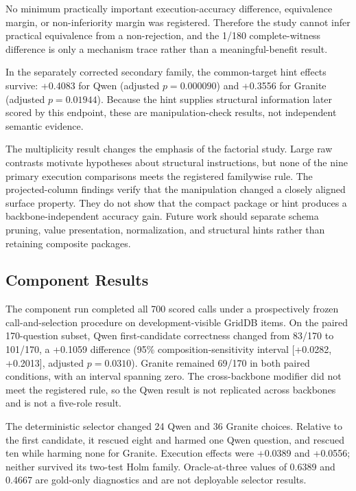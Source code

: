 \documentclass[applsci,article,submit,moreauthors]{Definitions/mdpi}
\begin{document}
No minimum practically important execution-accuracy difference, equivalence margin, or non-inferiority margin was registered. Therefore the study cannot infer practical equivalence from a non-rejection, and the 1/180 complete-witness difference is only a mechanism trace rather than a meaningful-benefit result.

In the separately corrected secondary family, the common-target hint effects survive: +0.4083 for Qwen (adjusted $p=0.000090$) and +0.3556 for Granite (adjusted $p=0.01944$). Because the hint supplies structural information later scored by this endpoint, these are manipulation-check results, not independent semantic evidence.

The multiplicity result changes the emphasis of the factorial study. Large raw contrasts motivate hypotheses about structural instructions, but none of the nine primary execution comparisons meets the registered familywise rule. The projected-column findings verify that the manipulation changed a closely aligned surface property. They do not show that the compact package or hint produces a backbone-independent accuracy gain. Future work should separate schema pruning, value presentation, normalization, and structural hints rather than retaining composite packages.

\subsection{Component Results}

The component run completed all 700 scored calls under a prospectively frozen call-and-selection procedure on development-visible GridDB items. On the paired 170-question subset, Qwen first-candidate correctness changed from 83/170 to 101/170, a +0.1059 difference (95\% composition-sensitivity interval [+0.0282, +0.2013], adjusted $p=0.0310$). Granite remained 69/170 in both paired conditions, with an interval spanning zero. The cross-backbone modifier did not meet the registered rule, so the Qwen result is not replicated across backbones and is not a five-role result.

The deterministic selector changed 24 Qwen and 36 Granite choices. Relative to the first candidate, it rescued eight and harmed one Qwen question, and rescued ten while harming none for Granite. Execution effects were +0.0389 and +0.0556; neither survived its two-test Holm family. Oracle-at-three values of 0.6389 and 0.4667 are gold-only diagnostics and are not deployable selector results.
\end{document}
